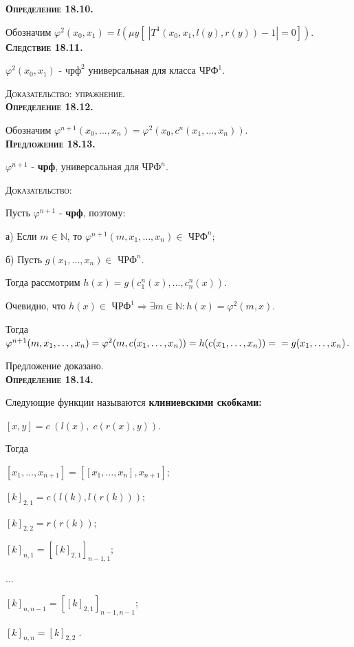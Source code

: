 \documentclass[18pt, a4paper]{extarticle}
\newcommand{\vp}{\varphi}
\newcommand{\dok}{\textsc{Доказательство:}}
\newcommand{\dokup}{\textsc{Доказательство: упражнение.}}
\begin{document}
\textbf{\textsc{Определение 18.10.}} 

Обозначим $\vp^2(x_0,x_1)=l(\mu y[\;|T^1(x_0,x_1,l(y),r(y))-1|=0])$.\\

\textbf{\textsc{Следствие 18.11.}} 

$\vp^2(x_0,x_1)$ -  \textbf{$\text{чрф}^2$} универсальная для класса \textbf{$\text{ЧРФ}^1$}.

\dokup\\

\textbf{\textsc{Определение 18.12.}} 

Обозначим $\vp^{n+1}(x_0,\dots,x_n)=\vp^2(x_0,c^n(x_1,\dots,x_n))$.\\

\textbf{\textsc{Предложение 18.13.}} 

$\vp^{n+1}$ -  \textbf{чрф}, универсальная для \textbf{$\text{ЧРФ}^n$}.

\dok

Пусть $\vp^{n+1}$ -  \textbf{чрф}, поэтому:

а) Если $m\in\mathbb N$, то $\vp^{n+1}(m,x_1,\dots,x_n)\in$ \textbf{$\text{ЧРФ}^n$};

б) Пусть $g(x_1,\dots,x_n)\in$ \textbf{$\text{ЧРФ}^n$}. 

Тогда рассмотрим $h(x)=g(c_1^n(x),\dots,c_n^n(x))$. 

Очевидно, что $h(x)\in$ \textbf{$\text{ЧРФ}^1$}$\Rightarrow\exists m\in\mathbb N:h(x)=\vp^2(m,x)$. 

Тогда $\vp^{n+1}(m,x_1,\dots,x_n)=\vp^2(m,c(x_1,\dots,x_n))=h(c(x_1,\dots,x_n))=\newline=g(x_1,\dots,x_n)$.

Предложение доказано.\\

\textbf{\textsc{Определение 18.14.}} 

Следующие функции называются \textbf{клиниевскими скобками:}

$[x,y]=c\;(l(x),\;c(r(x),y))$.

Тогда

$[x_1,\dots,x_{n+1}]=[[x_1,\dots,x_n],x_{n+1}];$

$[k]_{2, 1}=c(l(k),l(r(k)));$

$[k]_{2, 2}=r(r(k));$

$[k]_{n,1}=[[k]_{2,1}]_{n-1,1};$

...

$[k]_{n,n-1}=[[k]_{2,1}]_{n-1,n-1};$

$[k]_{n,n}=[k]_{2,2}\;$.\\
\end{document}
